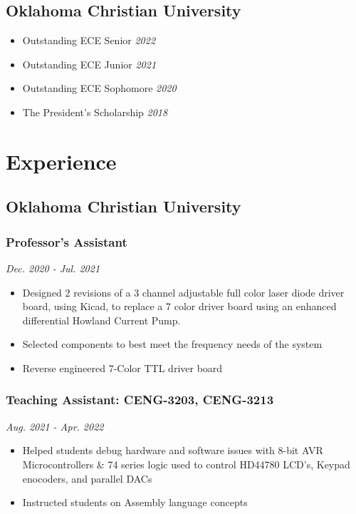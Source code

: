 \documentclass{article}
\begin{document}
\begin{spacing}{.5}
	\subsection{Oklahoma Christian University}
		\begin{itemize}[label=$\bullet$,itemsep=-.75ex]
			\item \small{Outstanding ECE Senior} \hfill \scriptsize{\textsl{2022}}
			\item \small{Outstanding ECE Junior} \hfill \scriptsize{\textsl{2021}}
			\item \small{Outstanding ECE Sophomore} \hfill \scriptsize{\textsl{2020}}
			\item \small{The President's Scholarship} \hfill \scriptsize{\textsl{2018}}
		\end{itemize}
\section{Experience}
	\subsection{Oklahoma Christian University}
		\subsubsection{\small{Professor's Assistant}} \hfill \scriptsize{\textsl{Dec. 2020 - Jul. 2021}}
			\begin{itemize}[label=--,itemsep=-.75ex]
				\item \small{Designed 2 revisions of a 3 channel adjustable full color laser diode driver board, using Kicad, to replace a 7 color driver board using an enhanced differential Howland Current Pump.}
				\item \small{Selected components to best meet the frequency needs of the system}
				\item \small{Reverse engineered 7-Color TTL driver board}
			\end{itemize}
		\subsubsection{\small{Teaching Assistant: CENG-3203, CENG-3213}} \hfill \scriptsize{\textsl{Aug. 2021 - Apr. 2022}}
			\begin{itemize}[label=--,itemsep=-.75ex]
				\item \small{Helped students debug hardware and software issues with 8-bit AVR Microcontrollers \& 74 series logic used to control HD44780 LCD's, Keypad enocoders, and parallel DACs}
				\item \small{Instructed students on Assembly language concepts}
			\end{itemize}

\end{spacing}
\end{document}
